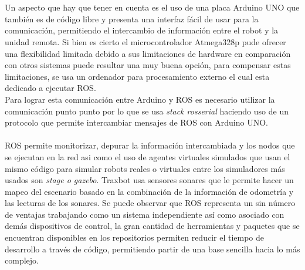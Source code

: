 \documentclass[12pt,a4paper]{article}
\begin{document}
\\\\
Un aspecto que hay que tener en cuenta es el uso de una placa Arduino UNO que también es de código libre y presenta una interfaz fácil de usar para la comunicación, permitiendo el intercambio de información entre el robot y la unidad remota. Si bien es cierto el microcontrolador Atmega328p pude ofrecer una flexibilidad limitada debido a sus limitaciones de hardware en comparación con otros sistemas puede resultar una muy buena opción, para compensar estas limitaciones, se usa un ordenador para procesamiento externo el cual esta dedicado a ejecutar ROS.
\\
Para lograr esta comunicación entre Arduino y ROS es necesario utilizar la comunicación punto punto por lo que se usa \textit{stack rosserial} haciendo uso de un protocolo que permite intercambiar mensajes de ROS con Arduino UNO.
\\\\
ROS permite monitorizar, depurar la información intercambiada y los nodos que se ejecutan en la red asi como el uso de agentes virtuales simulados que usan el mismo código para simular robots reales o virtuales entre los simuladores más usados son \textit{stage o gazebo}.
Traxbot usa sensores sonares que le permite hacer un mapeo del escenario basado en la combinación de la información de odometría y las lecturas de los sonares. 
Se puede observar que ROS representa un sin número de ventajas trabajando como un sistema independiente así como asociado con demás dispositivos de control, la gran cantidad de herramientas y paquetes que se encuentran disponibles en los repositorios permiten reducir el tiempo de desarrollo a través de código, permitiendo partir de una base sencilla hacia lo más complejo.
\end{document}
